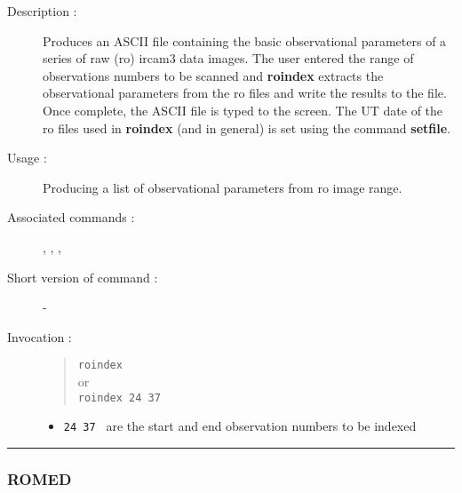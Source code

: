 \begin{description}

\item[Description :] Produces an ASCII file containing the basic
observational parameters of a series of raw ({\sc ro}) {\sc ircam3}
data images.  The user entered the range of observations numbers to be
scanned and {\bf roindex} extracts the observational parameters from
the {\sc ro} files and write the results to the file.  Once complete,
the ASCII file is typed to the screen.  The UT date of the {\sc ro}
files used in {\bf roindex} (and in general) is set using the command
{\bf setfile}.

\item[Usage :] Producing a list of observational parameters from {\sc ro} image
range.

\item[Associated commands :] {\tt {}},
{\tt {}}, {\tt {}},
{\tt {}}

\item[Short version of command :] -
\item[Invocation :]

\begin{quote}{\tt  roindex }\\
or \\
{\tt roindex 24 37 }
\end{quote}

\begin{itemize}

\item {\tt 24 37 } are the start and end observation numbers to be
 indexed
\end{itemize}

\end{description}

\hrule
\subsubsection*{\label{ROMED}ROMED}

